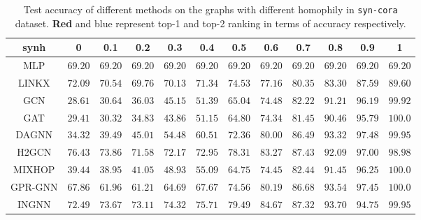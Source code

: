 \documentclass{article}
\theoremstyle{plain}
\newcommand{\pjn}{{INGNN}}
\begin{document}
\begin{table*}[h]
\centering
\caption{Test accuracy of different methods on the graphs with different homophily in \texttt{syn-cora} dataset. {\color{red} \textbf{Red}} and {\color{blue} blue} represent top-1 and top-2 ranking in terms of accuracy respectively.}
\label{tab:syn-cora-results}
\scriptsize
\tabcolsep=0.12cm
\begin{tabular}{c|ccccccccccc}
\toprule
synh   & 0    & 0.1    & 0.2    & 0.3    & 0.4    & 0.5    & 0.6    & 0.7    & 0.8    & 0.9    & 1    \\
\midrule
\midrule
MLP	& $69.20$	  & $69.20$	 & $69.20$	 & $69.20$	 & $69.20$	  & $69.20$	 & $69.20$	 & $69.20$	 & $69.20$	 & $69.20$	 & $69.20$	 \\
LINKX  & $72.09$	 & $70.54$	 & $69.76$	 & $70.13$	 & $71.34$	 & $74.53$	 & $77.16$	 & $80.35$	 & $83.30$	 & $87.59$	 & $89.60$	 \\
GCN	& $28.61$	 & $30.64$	 & $36.03$	 & $45.15$	 & $51.39$	  & $65.04$	 & $74.48$	 & $82.22$	 & $91.21$	 & $96.19$	 & $99.92$	 \\
GAT	& $29.41$	 & $30.32$	 & $34.83$	 & $43.86$	 & $51.15$	 & $64.80$	 & $74.34$	 & $81.45$	 & $90.46$	 & $95.79$	 & {\color[HTML]{FF0000} $\mathbf{100.0}$} \\
DAGNN  & $34.32$	 & $39.49$	 & $45.01$	 & $54.48$	 & $60.51$	 & $72.36$	 & $80.00$	 & $86.49$	 & $93.32$	 & {\color[HTML]{FF0000} $\mathbf{97.48}$} & {\color[HTML]{0000FF} $99.95$}	  \\
H2GCN  & {\color[HTML]{FF0000} $\mathbf{76.43}$} & {\color[HTML]{FF0000} $\mathbf{73.86}$} & {\color[HTML]{0000FF} $71.58$}	  & {\color[HTML]{0000FF} $72.17$}	  & {\color[HTML]{0000FF} $72.95$}	  & {\color[HTML]{0000FF} $78.31$}	  & {\color[HTML]{0000FF} $83.27$}	  & {\color[HTML]{FF0000} $\mathbf{87.43}$} & $92.09$	 & $97.00$	 & $98.98$	 \\
MIXHOP & $39.44$	 & $38.95$	 & $41.05$	 & $48.93$	 & $55.09$	 & $64.75$	 & $74.45$	 & $82.44$	 & $91.45$	 & $96.25$	 & {\color[HTML]{FF0000} $\mathbf{100.0}$} \\
GPR-GNN & $67.86$	 & $61.96$	 & $61.21$	 & $64.69$	 & $67.67$	 & $74.56$	 & $80.19$	 & $86.68$	 & {\color[HTML]{0000FF} $93.54$}	  & {\color[HTML]{0000FF} $97.45$}	  & {\color[HTML]{FF0000} $\mathbf{100.0}$} \\ \hline 
\pjn{}   & {\color[HTML]{0000FF} $72.49$}	  & {\color[HTML]{0000FF} $73.67$}	  & {\color[HTML]{FF0000} $\mathbf{73.11}$} & {\color[HTML]{FF0000} $\mathbf{74.32}$} & {\color[HTML]{FF0000} $\mathbf{75.71}$} & {\color[HTML]{FF0000} $\mathbf{79.49}$} & {\color[HTML]{FF0000} $\mathbf{84.67}$} & {\color[HTML]{0000FF} $87.32$}	  & {\color[HTML]{FF0000} $\mathbf{93.70}$} & $94.75$	 & {\color[HTML]{0000FF} $99.95$}	 \\
\bottomrule

\end{tabular}
\vspace{-10pt}
\end{table*}
\end{document}

